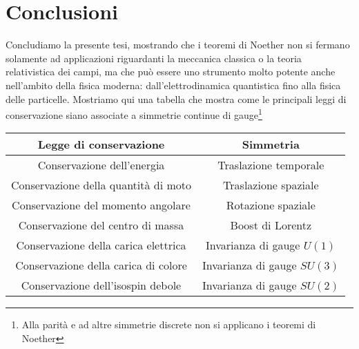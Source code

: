 \chapter*{Conclusioni}

    Concludiamo la presente tesi, mostrando che i teoremi di Noether non si fermano solamente ad applicazioni riguardanti la meccanica classica o la teoria relativistica dei campi, ma che può essere uno strumento molto potente anche nell'ambito della fisica moderna: dall'elettrodinamica quantistica fino alla fisica delle particelle. Mostriamo qui una tabella che mostra come le principali leggi di conservazione siano associate a simmetrie continue di gauge\footnote{Alla parità e ad altre simmetrie discrete non si applicano i teoremi di Noether}

    \begin{center}
    \begin{tabular}{ c | c } 
      Legge di conservazione & Simmetria \\ 
      \hline
      Conservazione dell'energia & Traslazione temporale \\ 
      \hline
      Conservazione della quantità di moto & Traslazione spaziale \\ 
      \hline
      Conservazione del momento angolare & Rotazione spaziale \\ 
      \hline
      Conservazione del centro di massa & Boost di Lorentz \\ 
      \hline
      Conservazione della carica elettrica & Invarianza di gauge $U(1)$ \\ 
      \hline
      Conservazione della carica di colore & Invarianza di gauge $SU(3)$ \\ 
      \hline
      Conservazione dell'isospin debole & Invarianza di gauge $SU(2)$ \\ 
    \end{tabular}
    \end{center}